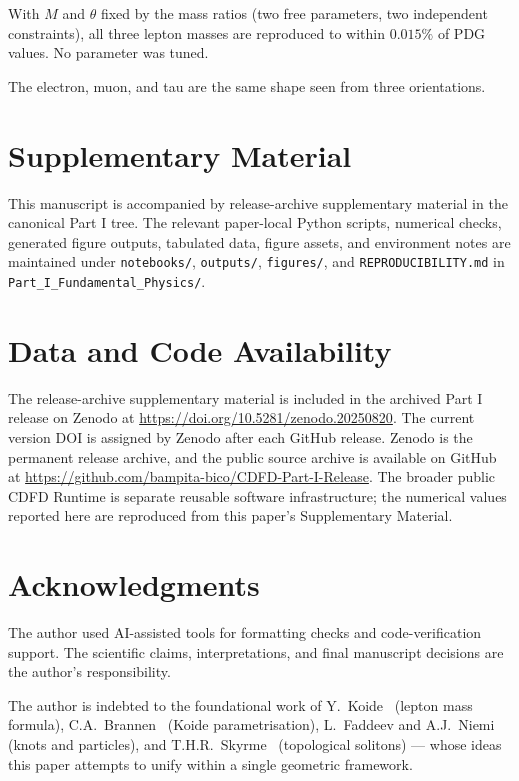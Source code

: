 \documentclass[11pt]{article}
\begin{document}
With $M$ and $\theta$ fixed by the mass ratios (two free parameters, two
independent constraints), all three lepton masses are reproduced to within $0.015\%$
of PDG values.
No parameter was tuned.

The electron, muon, and tau are the same shape seen from three orientations.


\section*{Supplementary Material}

This manuscript is accompanied by release-archive supplementary material in
the canonical Part I tree. The relevant paper-local Python scripts, numerical checks, generated figure outputs,
tabulated data, figure assets, and environment notes are maintained under
\texttt{notebooks/}, \texttt{outputs/}, \texttt{figures/}, and
\texttt{REPRODUCIBILITY.md} in \texttt{Part\_I\_Fundamental\_Physics/}.


\section*{Data and Code Availability}

The release-archive supplementary material is included in the archived Part I
release on Zenodo at \url{https://doi.org/10.5281/zenodo.20250820}. The current version DOI is assigned by Zenodo after each GitHub release. Zenodo is the
permanent release archive, and the public source archive is available on GitHub at
\url{https://github.com/bampita-bico/CDFD-Part-I-Release}. The broader public CDFD
Runtime is separate reusable software infrastructure; the numerical values reported
here are reproduced from this paper's Supplementary Material.


\section*{Acknowledgments}
The author used AI-assisted tools for formatting checks and code-verification
support. The scientific claims, interpretations, and final manuscript decisions
are the author's responsibility.

The author is indebted to the foundational work of
Y.~Koide~\cite{Koide1983,Koide2005} (lepton mass formula),
C.A.~Brannen~\cite{Brannen2006} (Koide parametrisation),
L.~Faddeev and A.J.~Niemi~\cite{FaddeevNiemi1997} (knots and particles),
and T.H.R.~Skyrme~\cite{Skyrme1961} (topological solitons)
--- whose ideas this paper attempts to unify within a single
geometric framework.
\end{document}
